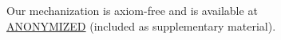\documentclass[sigplan,10pt,anonymous,review]{acmart}
\begin{document}
Our mechanization is axiom-free and is available at\\
\url{ANONYMIZED} (included as supplementary material).

\end{document}
